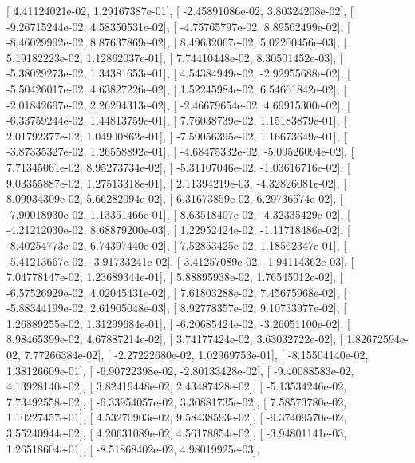 \documentclass{article}
\begin{document}
       [  4.41124021e-02,   1.29167387e-01],
       [ -2.45891086e-02,   3.80324208e-02],
       [ -9.26715244e-02,   4.58350531e-02],
       [ -4.75765797e-02,   8.89562499e-02],
       [ -8.46029992e-02,   8.87637869e-02],
       [  8.49632067e-02,   5.02200456e-03],
       [  5.19182223e-02,   1.12862037e-01],
       [  7.74410448e-02,   8.30501452e-03],
       [ -5.38029273e-02,   1.34381653e-01],
       [  4.54384949e-02,  -2.92955688e-02],
       [ -5.50426017e-02,   4.63827226e-02],
       [  1.52245984e-02,   6.54661842e-02],
       [ -2.01842697e-02,   2.26294313e-02],
       [ -2.46679654e-02,   4.69915300e-02],
       [ -6.33759244e-02,   1.44813759e-01],
       [  7.76038739e-02,   1.15183879e-01],
       [  2.01792377e-02,   1.04900862e-01],
       [ -7.59056395e-02,   1.16673649e-01],
       [ -3.87335327e-02,   1.26558892e-01],
       [ -4.68475332e-02,  -5.09526094e-02],
       [  7.71345061e-02,   8.95273734e-02],
       [ -5.31107046e-02,  -1.03616716e-02],
       [  9.03355887e-02,   1.27513318e-01],
       [  2.11394219e-03,  -4.32826081e-02],
       [  8.09934309e-02,   5.66282094e-02],
       [  6.31673859e-02,   6.29736574e-02],
       [ -7.90018930e-02,   1.13351466e-01],
       [  8.63518407e-02,  -4.32335429e-02],
       [ -4.21212030e-02,   8.68879200e-03],
       [  1.22952424e-02,  -1.11718486e-02],
       [ -8.40254773e-02,   6.74397440e-02],
       [  7.52853425e-02,   1.18562347e-01],
       [ -5.41213667e-02,  -3.91733241e-02],
       [  3.41257089e-02,  -1.94114362e-03],
       [  7.04778147e-02,   1.23689344e-01],
       [  5.88895938e-02,   1.76545012e-02],
       [ -6.57526929e-02,   4.02045431e-02],
       [  7.61803288e-02,   7.45675968e-02],
       [ -5.88344199e-02,   2.61905048e-03],
       [  8.92778357e-02,   9.10733977e-02],
       [  1.26889255e-02,   1.31299684e-01],
       [ -6.20685424e-02,  -3.26051100e-02],
       [  8.98465399e-02,   4.67887214e-02],
       [  3.74177424e-02,   3.63032722e-02],
       [  1.82672594e-02,   7.77266384e-02],
       [ -2.27222680e-02,   1.02969753e-01],
       [ -8.15504140e-02,   1.38126609e-01],
       [ -6.90722398e-02,  -2.80133428e-02],
       [ -9.40088583e-02,   4.13928140e-02],
       [  3.82419448e-02,   2.43487428e-02],
       [ -5.13534246e-02,   7.73492558e-02],
       [ -6.33954057e-02,   3.30881735e-02],
       [  7.58573780e-02,   1.10227457e-01],
       [  4.53270903e-02,   9.58438593e-02],
       [ -9.37409570e-02,   3.55240944e-02],
       [  4.20631089e-02,   4.56178854e-02],
       [ -3.94801141e-03,   1.26518604e-01],
       [ -8.51868402e-02,   4.98019925e-03],
\end{document}
